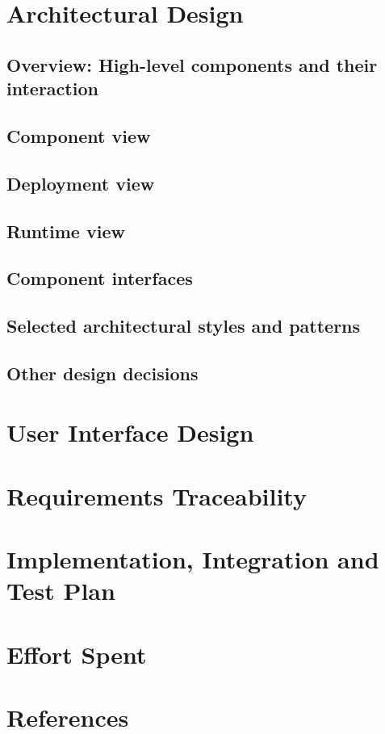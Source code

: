 \documentclass[a4paper]{article}
\begin{document}
\section{Architectural Design}

\subsection{Overview: High-level components and their interaction}

\subsection{Component view}

\subsection{Deployment view}

\subsection{Runtime view}

\subsection{Component interfaces}

\subsection{Selected architectural styles and patterns}

\subsection{Other design decisions}

\section{User Interface Design}

\section{Requirements Traceability}

\section{Implementation, Integration and Test Plan}

\section{Effort Spent}

\section{References}
\end{document}
